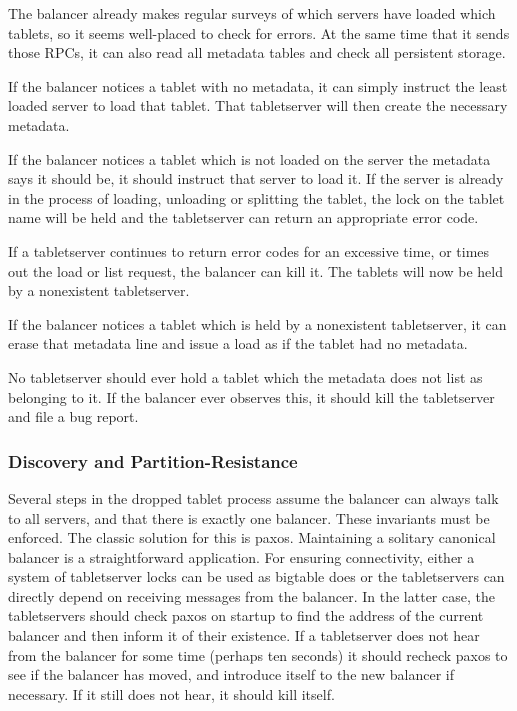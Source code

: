 \documentclass[11pt]{article}
\begin{document}
The balancer already makes regular surveys of which servers have loaded which tablets, so it seems well-placed to check for errors.  At the same time that it sends those RPCs, it can also read all metadata tables and check all persistent storage.

If the balancer notices a tablet with no metadata, it can simply instruct the least loaded server to load that tablet.  That tabletserver will then create the necessary metadata.

If the balancer notices a tablet which is not loaded on the server the metadata says it should be, it should instruct that server to load it.  If the server is already in the process of loading, unloading or splitting the tablet, the lock on the tablet name will be held and the tabletserver can return an appropriate error code.

If a tabletserver continues to return error codes for an excessive time, or times out the load or list request, the balancer can kill it.  The tablets will now be held by a nonexistent tabletserver.

If the balancer notices a tablet which is held by a nonexistent tabletserver, it can erase that metadata line and issue a load as if the tablet had no metadata.

No tabletserver should ever hold a tablet which the metadata does not list as belonging to it.  If the balancer ever observes this, it should kill the tabletserver and file a bug report.

\subsubsection{Discovery and Partition-Resistance}

Several steps in the dropped tablet process assume the balancer can always talk to all servers, and that there is exactly one balancer.  These invariants must be enforced.  The classic solution for this is paxos.  Maintaining a solitary canonical balancer is a straightforward application.  For ensuring connectivity, either a system of tabletserver locks can be used as bigtable does or the tabletservers can directly depend on receiving messages from the balancer.  In the latter case, the tabletservers should check paxos on startup to find the address of the current balancer and then inform it of their existence.  If a tabletserver does not hear from the balancer for some time (perhaps ten seconds) it should recheck paxos to see if the balancer has moved, and introduce itself to the new balancer if necessary.  If it still does not hear, it should kill itself.
\end{document}
